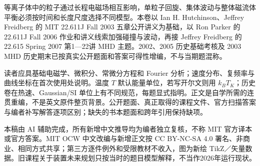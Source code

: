 \originalpreface
等离子体中的粒子通过长程电磁场相互影响，单粒子回旋、集体波动与整体磁流体平衡必须按时间和长度尺度选择不同模型。本卷以 Ian H. Hutchinson、Jeffrey Freidberg 的 MIT 22.611J Fall 2003 五章公开讲义为基础，以 Ron Parker 的 22.611J Fall 2006 作业和讲义线索加强碰撞与波动，再接 Jeffrey Freidberg 的 22.615 Spring 2007 第1—22讲 MHD 主题。2002、2005 历史基础考核及 2003 MHD 历史期末已按真实公开题面和答案可得性增编，不与当期题混称。

读者应具基础电磁学、微积分、常微分方程和 Fourier 分析；速度分布、复频率与曲线坐标在首次使用处说明。温度 $T$ 默认能量单位，若写开尔文则用 $k_BT_K$；历史卷在热速、Gaussian/SI 单位上有不同规范，每题显式指明。正文是自学所需的连贯重编，不是英文原件整页背景。公开题面、真正取得的课程文件、官方扫描答案与编者补写解答逐项区别；缺失的书本题面和跨年引用保持缺项。

本稿由 AI 辅助完成，所有新增中文推导均为编者独立复核，不称 MIT 官方译本或官方答案。MIT OCW 中文改编与新增正文按 CC BY-NC-SA 4.0 署名、非商业、相同方式共享；第三方逐件例外和受限教材不收入，图为新绘 TikZ／矢量数据。旧课程关于装置未来规划只按当时的题目模型解释，不当作2026年运行现状。
